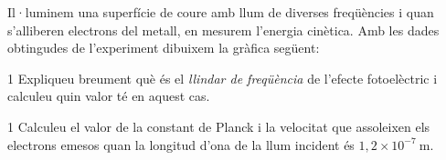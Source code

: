 Il·luminem una superfície de coure amb llum de diverses freqüències i quan s'alliberen electrons del metall, en mesurem l'energia cinètica. Amb les dades obtingudes de l'experiment dibuixem la gràfica següent:


\begin{apartat}{1}
Expliqueu breument què és el \textit{llindar de freqüència} de l'efecte fotoelèctric i calculeu quin valor té en aquest cas.
\end{apartat}

\begin{apartat}{1}
Calculeu el valor de la constant de Planck i la velocitat que assoleixen els electrons emesos quan la longitud d'ona de la llum incident és $1,2\times 10^{-7}\ \mathrm{m}$.
\end{apartat}

